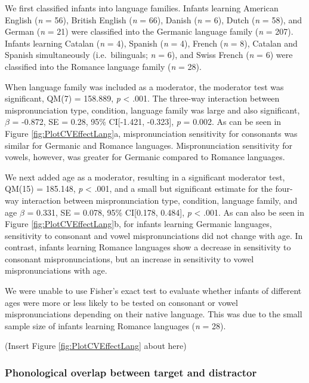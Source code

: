 \documentclass[man]{apa6}
\begin{document}
We first classified infants into language families. Infants learning American English (\emph{n} = 56), British English (\emph{n} = 66), Danish (\emph{n} = 6), Dutch (\emph{n} = 58), and German (\emph{n} = 21) were classified into the Germanic language family (\emph{n} = 207). Infants learning Catalan (\emph{n} = 4), Spanish (\emph{n} = 4), French (\emph{n} = 8), Catalan and Spanish simultaneously (i.e.~bilinguals; \emph{n} = 6), and Swiss French (\emph{n} = 6) were classified into the Romance language family (\emph{n} = 28).

When language family was included as a moderator, the moderator test was significant, QM(7) = 158.889, \emph{p} \textless{} .001. The three-way interaction between mispronunciation type, condition, language family was large and also significant, \(\beta\) = -0.872, SE = 0.28, 95\% CI{[}-1.421, -0.323{]}, \emph{p} = 0.002. As can be seen in Figure \ref{fig:PlotCVEffectLang}a, mispronunciation sensitivity for consonants was similar for Germanic and Romance languages. Mispronunciation sensitivity for vowels, however, was greater for Germanic compared to Romance languages.

We next added age as a moderator, resulting in a significant moderator test, QM(15) = 185.148, \emph{p} \textless{} .001, and a small but significant estimate for the four-way interaction between mispronunciation type, condition, language family, and age \(\beta\) = 0.331, SE = 0.078, 95\% CI{[}0.178, 0.484{]}, \emph{p} \textless{} .001. As can also be seen in Figure \ref{fig:PlotCVEffectLang}b, for infants learning Germanic languages, sensitivity to consonant and vowel mispronunciations did not change with age. In contrast, infants learning Romance languages show a decrease in sensitivity to consonant mispronunciations, but an increase in sensitivity to vowel mispronunciations with age.

We were unable to use Fisher's exact test to evaluate whether infants of different ages were more or less likely to be tested on consonant or vowel mispronunciations depending on their native language. This was due to the small sample size of infants learning Romance languages (\emph{n} = 28).

(Insert Figure \ref{fig:PlotCVEffectLang} about here)

\hypertarget{phonological-overlap-between-target-and-distractor}{%
\subsubsection{Phonological overlap between target and distractor}\label{phonological-overlap-between-target-and-distractor}}
\end{document}
